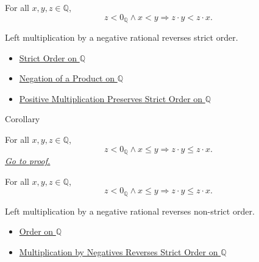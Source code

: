 \begin{remark*}
For all $x,y,z\in\mathbb{Q}$,
\[
z<0_{\mathbb{Q}}\land x<y
\Longrightarrow
z\cdot y<z\cdot x.
\]
\end{remark*}

\begin{remark*}[Interpretation]
Left multiplication by a negative rational reverses strict order.
\end{remark*}

\begin{dependencies}
\begin{itemize}
  \item \hyperref[def:strict-order-on-q]{Strict Order on $\mathbb{Q}$}
  \item \hyperref[cor:negation-of-product-on-q]{Negation of a Product on $\mathbb{Q}$}
  \item \hyperref[thm:positive-multiplication-preserves-strict-order-on-q]{Positive Multiplication Preserves Strict Order on $\mathbb{Q}$}
\end{itemize}
\end{dependencies}

\begin{corollarybox}{Corollary}
\begin{corollary}
\label{cor:negative-multiplication-reverses-order-on-q}
For all $x,y,z\in\mathbb{Q}$,
\[
z<0_{\mathbb{Q}}\land x\le y
\Longrightarrow
z\cdot y\le z\cdot x.
\]
\hyperref[prf:negative-multiplication-reverses-order-on-q]{\textit{Go to proof.}}
\end{corollary}
\end{corollarybox}

\begin{remark*}
For all $x,y,z\in\mathbb{Q}$,
\[
z<0_{\mathbb{Q}}\land x\le y
\Longrightarrow
z\cdot y\le z\cdot x.
\]
\end{remark*}

\begin{remark*}[Interpretation]
Left multiplication by a negative rational reverses non-strict order.
\end{remark*}

\begin{dependencies}
\begin{itemize}
  \item \hyperref[def:order-on-q]{Order on $\mathbb{Q}$}
  \item \hyperref[thm:negative-multiplication-reverses-strict-order-on-q]{Multiplication by Negatives Reverses Strict Order on $\mathbb{Q}$}
\end{itemize}
\end{dependencies}

